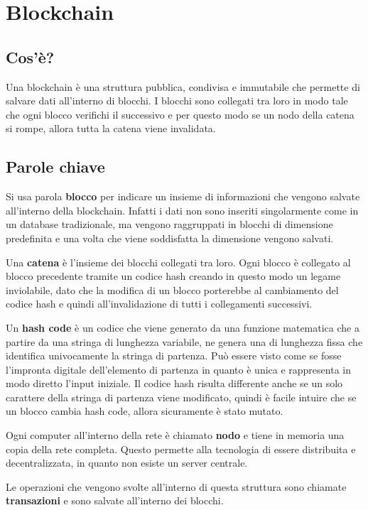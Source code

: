 \chapter{Blockchain}
\label{cha:blockchain}

\section{Cos'è?}
Una blockchain è una struttura pubblica, condivisa e immutabile che permette di
salvare dati all'interno di blocchi. I blocchi sono collegati tra loro in modo
tale che ogni blocco verifichi il successivo e per questo modo se un nodo della
catena si rompe, allora tutta la catena viene invalidata.

\section{Parole chiave}
Si usa parola \textbf{blocco} per indicare un insieme di informazioni che
vengono salvate all'interno della blockchain. Infatti i dati non sono inseriti
singolarmente come in un database tradizionale, ma vengono raggruppati in
blocchi di dimensione predefinita e una volta che viene soddisfatta la
dimensione vengono salvati.

Una \textbf{catena} è l'insieme dei blocchi collegati tra loro. Ogni blocco è 
collegato al blocco precedente tramite un codice hash creando in questo modo
un legame inviolabile, dato che la modifica di un blocco porterebbe al 
cambiamento del codice hash e quindi all'invalidazione di tutti i collegamenti
successivi.

Un \textbf{hash code} è un codice che viene generato da una funzione matematica
che a partire da una stringa di lunghezza variabile, ne genera una di lunghezza
fissa che identifica univocamente la stringa di partenza. Può essere visto come
se fosse l'impronta digitale dell'elemento di partenza in quanto è unica e 
rappresenta in modo diretto l'input iniziale. Il codice hash risulta differente
anche se un solo carattere della stringa di partenza viene modificato, quindi è 
facile intuire che se un blocco cambia hash code, allora sicuramente è stato
mutato.

Ogni computer all'interno della rete è chiamato \textbf{nodo} e tiene in 
memoria una copia della rete completa. Questo permette alla tecnologia di 
essere distribuita e decentralizzata, in quanto non esiste un server centrale.

Le operazioni che vengono svolte all'interno di questa struttura sono chiamate
\textbf{transazioni} e sono salvate all'interno dei blocchi.

